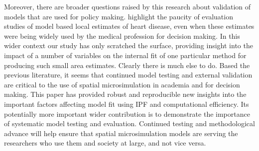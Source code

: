 \documentclass[a4paper,10pt]{article}
\begin{document}
Moreover, there are broader questions raised by this research about validation
of models that are used for policy making. \citet{Scarborough2009} highlight the
paucity of evaluation studies of model based local estimates of heart disease,
even when these estimates were being widely used by the medical profession for
decision making. In this wider context our study has only scratched the surface,
providing insight into the impact of a number of variables on the internal fit of
one particular method for producing such small area estimates. Clearly there is
much else to do. Based the previous literature, it seems that
continued model testing and external validation are critical to the use of spatial
microsimulation in academia and for decision making.
This paper has provided robust and reproducible new insights into the important factors affecting model
fit using IPF and computational efficiency. Its potentially more important
wider contribution is to demonstrate the importance of
systematic model testing and evaluation. Continued testing and methodological advance
will help ensure that spatial microsimulation
models are serving the researchers who use them and society at large, and not vice versa.





% 
% 
% 
% 
%  
% 
% 
\end{document}
